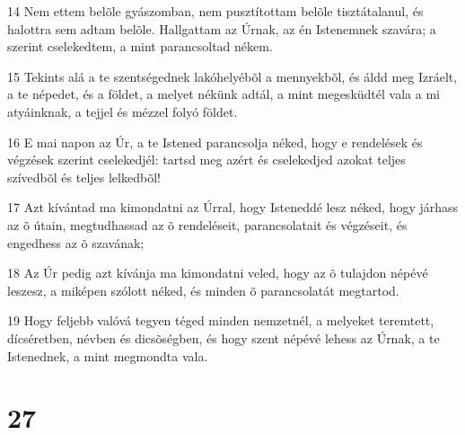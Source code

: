 \par 14 Nem ettem belõle gyászomban, nem pusztítottam belõle tisztátalanul, és halottra sem adtam belõle. Hallgattam az Úrnak, az én Istenemnek szavára; a szerint cselekedtem, a mint parancsoltad nékem.
\par 15 Tekints alá a te szentségednek lakóhelyébõl a mennyekbõl, és áldd meg Izráelt, a te népedet, és a földet, a melyet nékünk adtál, a mint megesküdtél vala a mi atyáinknak, a tejjel és mézzel folyó földet.
\par 16 E mai napon az Úr, a te Istened parancsolja néked, hogy e rendelések és végzések szerint cselekedjél: tartsd meg azért és cselekedjed azokat teljes szívedbõl és teljes lelkedbõl!
\par 17 Azt kívántad ma kimondatni az Úrral, hogy Isteneddé lesz néked, hogy járhass az õ útain, megtudhassad az õ rendeléseit, parancsolatait és végzéseit, és engedhess az õ szavának;
\par 18 Az Úr pedig azt kívánja ma kimondatni veled, hogy az õ tulajdon népévé leszesz, a miképen szólott néked, és minden õ parancsolatát megtartod.
\par 19 Hogy feljebb valóvá tegyen téged minden nemzetnél, a melyeket teremtett, dícséretben, névben és dicsõségben, és hogy szent népévé lehess az Úrnak, a te Istenednek, a mint megmondta vala.

\chapter{27}

